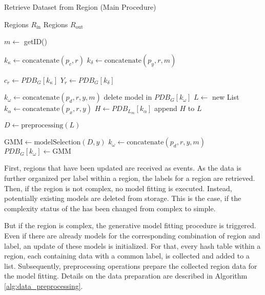 \begin{algorithm}
    \caption{Retrieve Dataset from Region (Main Procedure)}
    \label{alg:generative_fitting}
 
    \begin{algorithmic}[1]
        \REQUIRE Regions $R_{\text{in}}$
        \ENSURE Regions $R_{\text{out}}$

        \STATE $m \leftarrow$ getID()

            \STATE $k_\kappa \leftarrow \text{concatenate}(p_c, r)$
            \STATE $k_\delta \leftarrow \text{concatenate}(p_y, r, m)$

            \STATE $c_r \leftarrow PDB_G[k_\kappa]$
            \STATE $Y_r \leftarrow PDB_G[k_\delta]$ %

                    \STATE $k_\omega \leftarrow \text{concatenate}(p_d, r, y, m)$ 
                    \STATE delete model in $PDB_G[k_\omega]$
                \ENDFOR
            \ELSE
                \STATE $L \leftarrow$ new List
                    \STATE $k_\alpha \leftarrow \text{concatenate}(p_x, r, y)$
                    \STATE $H \leftarrow PDB_{L_m}[k_\alpha]$
                    \STATE append $H$ to $L$
                \ENDFOR

                \STATE $D \leftarrow \text{preprocessing}(L)$

                    \STATE $\text{GMM} \leftarrow \text{modelSelection}(D, y)$
                    \STATE $k_\omega \leftarrow \text{concatenate}(p_d, r, y, m)$ 
                    \STATE $PDB_G[k_\omega] \leftarrow \text{GMM}$
                \ENDFOR
            \ENDIF
            


        \ENDFOR
    \end{algorithmic}
 \end{algorithm}

 First, regions that have been updated are received as events. As the data is further organized per label within a region, the labels for a region are retrieved. Then, if the region is not complex, no model fitting is executed. Instead, potentially existing models are deleted from storage. This is the case, if the complexity status of the has been changed from complex to simple.

 But if the region is complex, the generative model fitting procedure is triggered. Even if there are already models for the corresponding combination of region and label, an update of these models is initialized. For that, every hash table within a region, each containing data with a common label, is collected and added to a list. Subsequently, preprocessing operations prepare the collected region data for the model fitting. Details on the data preparation are described in Algorithm \ref{alg:data_preprocessing}.

